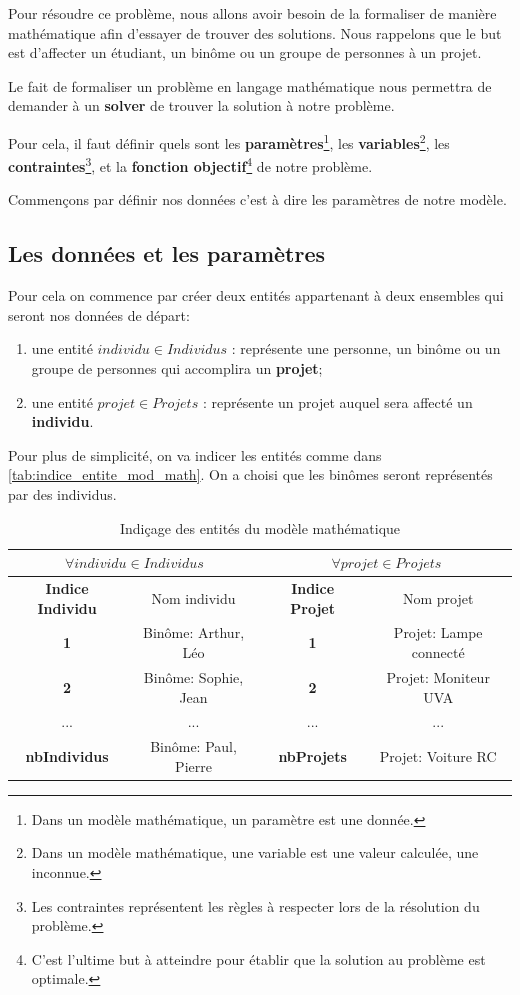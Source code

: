 \documentclass{polytech/polytech}
\begin{document}
Pour résoudre ce problème, nous allons avoir besoin de la formaliser de manière mathématique afin d'essayer de trouver des solutions.
Nous rappelons que le but est d'affecter un étudiant, un binôme ou un groupe de personnes à un projet.

Le fait de formaliser un problème en langage mathématique nous permettra de demander à un \textbf{solver} de trouver la solution à notre problème.

Pour cela, il faut définir quels sont les \textbf{paramètres}\footnote{Dans un modèle mathématique, un paramètre est une donnée.}, les \textbf{ variables}\footnote{Dans un modèle mathématique, une variable est une valeur calculée, une inconnue.}, les \textbf{contraintes}\footnote{Les contraintes représentent les règles à respecter lors de la résolution du problème.}, et la \textbf{fonction objectif}\footnote{C'est l'ultime but à atteindre pour établir que la solution au problème est optimale.} de notre problème.

Commençons par définir nos données c'est à dire les paramètres de notre modèle.

\subsection{Les données et les paramètres}
\label{sec:donnees_params}
Pour cela on commence par créer deux entités appartenant à deux ensembles qui seront nos données de départ:
\begin{enumerate}
\item une entité $individu \in Individus$ : représente une personne, un binôme ou un groupe de personnes qui accomplira un \textbf{projet};
\item une entité  $projet \in Projets$ : représente un projet auquel sera affecté un \textbf{individu}.
\end{enumerate}

Pour plus de simplicité, on va indicer les entités comme dans \autoref{tab:indice_entite_mod_math}. On a choisi que les binômes seront représentés par des individus.
\begin{table}
\caption{\label{tab:indice_entite_mod_math}Indiçage des entités du modèle mathématique}
\begin{tabular}{|c|c|c|c|}
\hline
\multicolumn{2}{|c|}{$\forall individu \in Individus$} & \multicolumn{2}{|c|}{$\forall projet \in Projets$} \\
\hline
\textbf{Indice Individu} & Nom individu &\textbf{ Indice Projet} & Nom projet \\
\hline
\textbf{1} & Binôme: Arthur, Léo & \textbf{1} & Projet: Lampe connecté \\
\hline
\textbf{2} & Binôme: Sophie, Jean & \textbf{2} & Projet: Moniteur UVA \\
\hline
... & ... & ... & ... \\
\hline
\textbf{nbIndividus} & Binôme: Paul, Pierre &\textbf{ nbProjets} & Projet: Voiture RC \\
\hline
\end{tabular}
\end{table}
\end{document}
